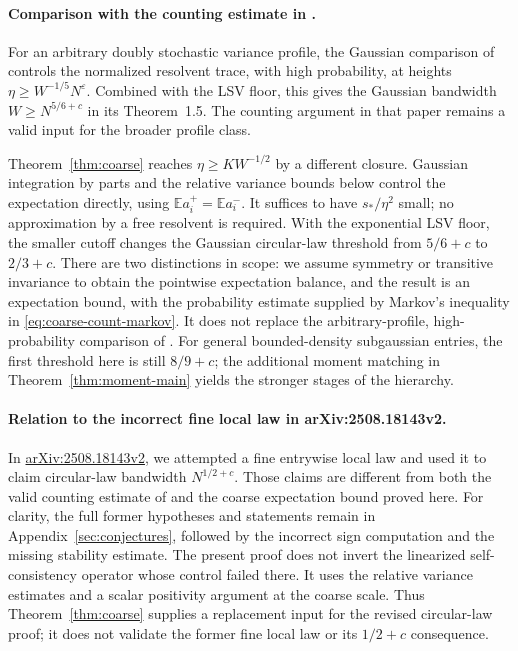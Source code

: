 \documentclass[11pt,reqno]{amsart}
\numberwithin{equation}{section}
\theoremstyle{plain}
\theoremstyle{definition}
\theoremstyle{remark}
\begin{document}
\paragraph{Comparison with the counting estimate in \cite{han2024circular}.}
For an arbitrary doubly stochastic variance profile, the Gaussian
comparison of \cite[Proposition~3.2 and Corollary~3.3]{han2024circular}
controls the normalized resolvent trace, with high probability, at
heights $\eta\ge W^{-1/5}N^\varepsilon$. Combined with the LSV floor,
this gives the Gaussian bandwidth $W\ge N^{5/6+c}$ in its Theorem~1.5.
The counting argument in that paper remains a valid input for the
broader profile class.

Theorem~\ref{thm:coarse} reaches $\eta\ge KW^{-1/2}$ by a different
closure. Gaussian integration by parts and the relative variance bounds
below control the expectation directly, using
$\mathbb E a_i^+=\mathbb E a_i^-$. It suffices to have
$s_*/\eta^2$ small; no approximation by a free resolvent is required.
With the exponential LSV floor, the smaller cutoff changes the Gaussian
circular-law threshold from $5/6+c$ to $2/3+c$.
There are two distinctions in scope: we assume symmetry or transitive
invariance to obtain the pointwise expectation balance, and the result
is an expectation bound, with the probability estimate supplied by
Markov's inequality in \eqref{eq:coarse-count-markov}.
It does not replace the arbitrary-profile, high-probability comparison
of \cite{han2024circular}. For general bounded-density subgaussian
entries, the first threshold here is still $8/9+c$; the additional
moment matching in Theorem~\ref{thm:moment-main} yields the stronger
stages of the hierarchy.

\paragraph{Relation to the incorrect fine local law in arXiv:2508.18143v2.}
In \href{https://arxiv.org/abs/2508.18143v2}{arXiv:2508.18143v2}, we attempted a fine entrywise
local law and used it to claim circular-law bandwidth $N^{1/2+c}$.
Those claims are different from both the valid counting estimate of
\cite{han2024circular} and the coarse expectation bound proved here.
For clarity, the full former hypotheses and statements remain in
Appendix~\ref{sec:conjectures}, followed by the incorrect sign computation
and the missing stability estimate. The present proof does not invert
the linearized self-consistency operator whose control failed there.
It uses the relative variance estimates and a scalar positivity argument
at the coarse scale. Thus Theorem~\ref{thm:coarse} supplies a replacement
input for the revised circular-law proof; it does not validate the
former fine local law or its $1/2+c$ consequence.
\end{document}
